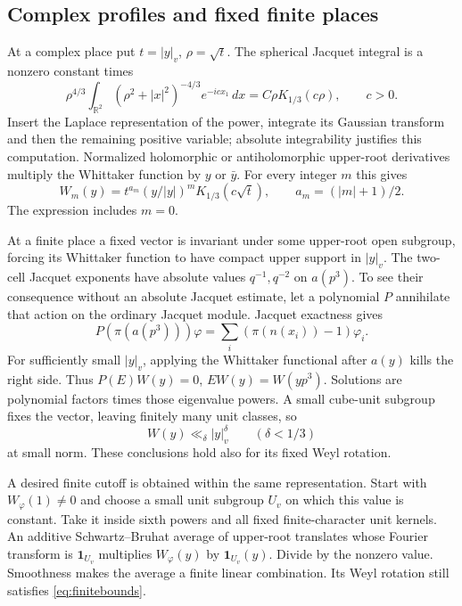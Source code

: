 \documentclass[11pt,a4paper]{article}
\numberwithin{equation}{section}
\theoremstyle{definition}
\theoremstyle{remark}
\newcommand{\R}{\mathbb R}
\newcommand{\ind}{\mathbf1}
\newcommand{\dd}{\,d}
\begin{document}
\subsection{Complex profiles and fixed finite places}\label{sec:localprofiles}
At a complex place put $t=|y|_v$, $\rho=\sqrt t$. The spherical Jacquet integral is a nonzero constant times
\[
 \rho^{4/3}\int_{\R^2}(\rho^2+|x|^2)^{-4/3}e^{-icx_1}\dd x
       =C\rho K_{1/3}(c\rho),\qquad c>0.
\]
Insert the Laplace representation of the power, integrate its Gaussian transform and then the remaining positive variable; absolute integrability justifies this computation. Normalized holomorphic or antiholomorphic upper-root derivatives multiply the Whittaker function by $y$ or $\bar y$. For every integer $m$ this gives
\begin{equation}\label{eq:mode}
 W_m(y)=t^{a_m}(y/|y|)^mK_{1/3}(c\sqrt t),
 \qquad a_m=(|m|+1)/2.
\end{equation}
The expression includes $m=0$.

At a finite place a fixed vector is invariant under some upper-root open subgroup, forcing its Whittaker function to have compact upper support in $|y|_v$. The two-cell Jacquet exponents have absolute values $q^{-1},q^{-2}$ on $a(p^3)$. To see their consequence without an absolute Jacquet estimate, let a polynomial $P$ annihilate that action on the ordinary Jacquet module. Jacquet exactness gives
\[
 P(\pi(a(p^3)))\varphi=\sum_i(\pi(n(x_i))-1)\varphi_i.
\]
For sufficiently small $|y|_v$, applying the Whittaker functional after $a(y)$ kills the right side. Thus $P(E)W(y)=0$, $EW(y)=W(yp^3)$. Solutions are polynomial factors times those eigenvalue powers. A small cube-unit subgroup fixes the vector, leaving finitely many unit classes, so
\begin{equation}\label{eq:finitebounds}
 W(y)\ll_\delta |y|_v^\delta\qquad(\delta<1/3)
\end{equation}
at small norm. These conclusions hold also for its fixed Weyl rotation.

A desired finite cutoff is obtained within the same representation. Start with $W_\varphi(1)\ne0$ and choose a small unit subgroup $U_v$ on which this value is constant. Take it inside sixth powers and all fixed finite-character unit kernels. An additive Schwartz--Bruhat average of upper-root translates whose Fourier transform is $\ind_{U_v}$ multiplies $W_\varphi(y)$ by $\ind_{U_v}(y)$. Divide by the nonzero value. Smoothness makes the average a finite linear combination. Its Weyl rotation still satisfies \eqref{eq:finitebounds}.
\end{document}
